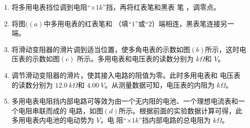 \begin{enumerate}
\begin{figure}[h!]
\end{figure}

\begin{enumerate}
\item
将多用电表挡位调到电阻“$ \times 1k $”挡，再将红表笔和黑表
笔 \underlinegap ，调零点。


\item 
将图$ ((a) $中多用电表的红表笔和 \underlinegap 
（填“$ 1 $”或“$ 2 $）端相连，黑表笔连接另一端。


\item 
将滑动变阻器的滑片调到适当位置，使多角电表的示数如图$ (b) $所示，这时电压表的示数如图$ (c) $
所示。多用电表和电压表的读数分别为 \underlinegap $ k \Omega $和 \underlinegap $ V $。



\item 
调节滑动变阻器的滑片，使其接入电路的阻值为零。此时多用电表和
电压表的读数分别为 $ 12.0 \ k\Omega $和 $ 4.00 \ V $。从测量数据可知，电压表的内阻为 \underlinegap $ k \Omega $。




\item 
多用电表电阻挡内部电路可等效为由一个无内阻的电池、一个理想电流表和一个电阻串联而成的
电路，如图$ (d) $所示。根据前面的实验数据计算可得，此多用电表内电池的电动势为 \underlinegap $ V $，电
阻“$ \times 1k $”挡内部电路的总电阻为 \underlinegap $ k \Omega $。


\end{enumerate}








\end{enumerate}
